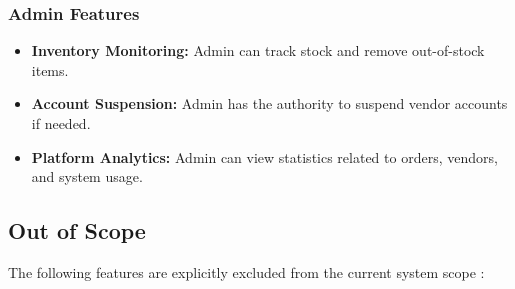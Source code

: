 \documentclass[12pt,a4paper]{article}
\begin{document}
\subsubsection{Admin Features}
\begin{itemize}[leftmargin=2em, itemsep=6pt]
    \item \textbf{Inventory Monitoring:} Admin can track stock and remove out-of-stock items.
    \item \textbf{Account Suspension:} Admin has the authority to suspend vendor accounts if needed.
    \item \textbf{Platform Analytics:} Admin can view statistics related to orders, vendors, and system usage.
\end{itemize}



\subsection{Out of Scope}
The following features are explicitly excluded from the current system scope :
\end{document}
